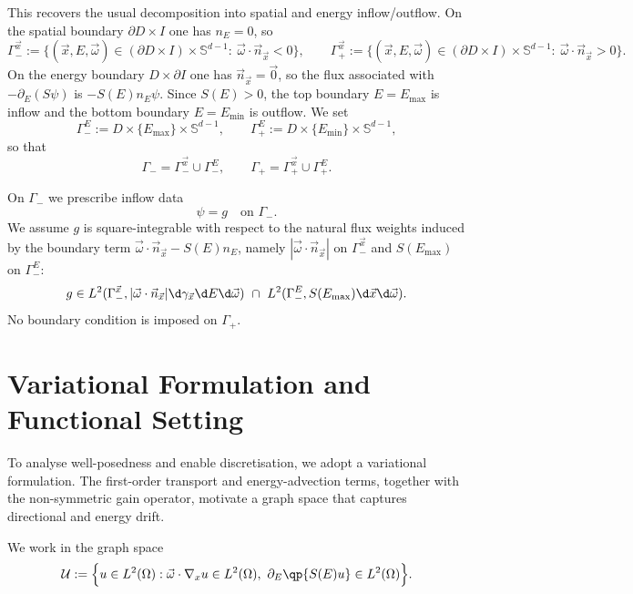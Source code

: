 \documentclass[final]{amsart}
\begin{document}
This recovers the usual decomposition into spatial and energy inflow/outflow.
On the spatial boundary $\partial D\times I$ one has $n_E=0$, so
\[
  \Gamma_-^{\vec x}
  :=
  \{(\vec x,E,\vec\omega)\in(\partial D\times I)\times\mathbb S^{d-1}:\ \vec\omega\cdot\vec n_{\vec x}<0\},
  \qquad
  \Gamma_+^{\vec x}
  :=
  \{(\vec x,E,\vec\omega)\in(\partial D\times I)\times\mathbb S^{d-1}:\ \vec\omega\cdot\vec n_{\vec x}>0\}.
\]
On the energy boundary $D\times\partial I$ one has $\vec n_{\vec x}=\vec 0$,
so the flux associated with $-\partial_E(S\psi)$ is $-S(E) n_E \psi$.
Since $S(E)>0$, the top boundary $E=E_{\max}$ is inflow and the bottom
boundary $E=E_{\min}$ is outflow. We set
\[
  \Gamma_-^{E} := D\times\{E_{\max}\}\times\mathbb S^{d-1},
  \qquad
  \Gamma_+^{E} := D\times\{E_{\min}\}\times\mathbb S^{d-1},
\]
so that
\[
  \Gamma_- = \Gamma_-^{\vec x}\cup \Gamma_-^{E},
  \qquad
  \Gamma_+ = \Gamma_+^{\vec x}\cup \Gamma_+^{E}.
\]

On $\Gamma_-$ we prescribe inflow data
\begin{equation}\label{eq:inflowBC}
  \psi = g \quad \text{on }\Gamma_-.
\end{equation}
We assume $g$ is square-integrable with respect to the natural flux
weights induced by the boundary term $\vec\omega\cdot\vec n_{\vec x}-S(E)n_E$,
namely $|\vec\omega\cdot\vec n_{\vec x}|$ on $\Gamma_-^{\vec x}$ and
$S(E_{\max})$ on $\Gamma_-^{E}$:
\[
  g\in L^2(\Gamma_-^{\vec x}, |\vec\omega\cdot \vec n_{\vec x}| \d\gamma_{\vec x} \d E \d\vec\omega)
  \ \cap\
  L^2(\Gamma_-^{E}, S(E_{\max}) \d\vec x \d\vec\omega).
\]
No boundary condition is imposed on $\Gamma_+$.

\section{Variational Formulation and Functional Setting}
\label{sec:variational}

To analyse well-posedness and enable discretisation, we adopt a
variational formulation. The first-order transport and energy-advection
terms, together with the non-symmetric gain operator, motivate a graph
space that captures directional and energy drift.

We work in the graph space
\begin{equation}
  \label{eq:Uspace}
  \mathcal{U}
  :=
  \Big\{ u \in L^2(\Omega)  : 
  \vec{\omega}\cdot\nabla_x u \in L^2(\Omega),
  \ \partial_E\qp{S(E)u} \in L^2(\Omega) \Big\}.
\end{equation}
\end{document}
